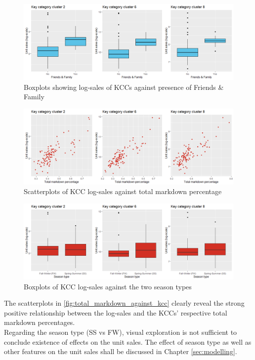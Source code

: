 \begin{figure}[H]
\centering
  \includegraphics[width=0.95\linewidth]{figures/ff_kcc_boxplot.png}
  \caption{Boxplots showing log-sales of KCCs against presence of Friends \& Family}
  \label{fig:ff_kcc_boxplot}
\end{figure}








\begin{figure}[H]
\centering
  \includegraphics[width=0.95\linewidth]{figures/total_markdown_against_kcc.png}
  \caption{Scatterplots of \ac{KCC} log-sales against total markdown percentage}
  \label{fig:total_markdown_against_kcc}
\end{figure}






\begin{figure}[H]
\centering
  \includegraphics[width=0.95\linewidth]{figures/season_type_against_kcc.png}
  \caption{Boxplots of \ac{KCC} log-sales against the two season types}
  \label{fig:season_type_against_kcc}
\end{figure}


The scatterplots in \autoref{fig:total_markdown_against_kcc} clearly reveal the strong positive relationship between the log-sales and the \ac{KCC}s' respective total markdown percentages.
\\

Regarding the season type (SS vs FW), visual exploration is not sufficient to conclude existence of effects on the unit sales. The effect of season type as well as other features on the unit sales shall be discussed in Chapter \ref{sec:modelling}.
